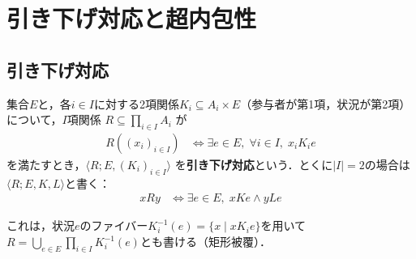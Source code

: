 \documentclass[../../main-detail.tex]{subfiles}
\begin{document}
\section{引き下げ対応と超内包性}
\subsection{引き下げ対応}
\begin{definition}
    集合$E$と，各$i \in I$に対する2項関係$K_i \subseteq A_i \times E$（参与者が第1項，状況が第2項）について，$I$項関係 $R \subseteq \prod_{i \in I} A_i$ が
    \begin{align*}
        R((x_i)_{i \in I}) &\iff \exists e \in E,\; \forall i \in I,\; x_i K_i e
    \end{align*}
    を満たすとき，$\langle R; E, (K_i)_{i \in I} \rangle$ を\textbf{引き下げ対応}という．とくに$|I| = 2$の場合は$\langle R; E, K, L\rangle$と書く：
    \begin{align*}
        xRy &\iff \exists e\in E,\; xKe \land yLe
    \end{align*}
\end{definition}
これは，状況$e$のファイバー$K_i^{-1}(e) = \{x \mid x K_i e\}$を用いて$R = \bigcup_{e\in E} \prod_{i \in I} K_i^{-1}(e)$とも書ける（矩形被覆）．
\end{document}
